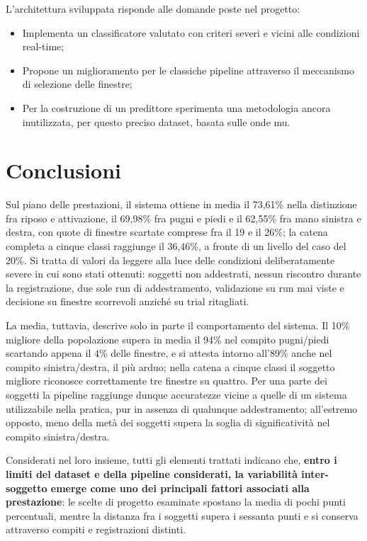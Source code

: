 L'architettura sviluppata risponde alle domande poste nel progetto: 
\begin{itemize}
    \item Implementa un classificatore valutato con criteri severi e vicini alle condizioni real-time;
    \item Propone un miglioramento per le classiche pipeline attraverso il meccanismo di selezione delle finestre;
    \item Per la costruzione di un predittore sperimenta una metodologia ancora inutilizzata, per questo preciso dataset, basata sulle onde mu.
\end{itemize}

\section{Conclusioni}
Sul piano delle prestazioni, il sistema ottiene in media il 73,61\% nella distinzione fra riposo e attivazione, il 69,98\% fra pugni e piedi e il 62,55\% fra mano sinistra e destra, con quote di finestre scartate comprese fra il 19 e il 26\%; la catena completa a cinque classi raggiunge il 36,46\%, a fronte di un livello del caso del 20\%. Si tratta di valori da leggere alla luce delle condizioni deliberatamente severe in cui sono stati ottenuti: soggetti non addestrati, nessun riscontro durante la registrazione, due sole run di addestramento, validazione su run mai viste e decisione su finestre scorrevoli anziché su trial ritagliati.

La media, tuttavia, descrive solo in parte il comportamento del sistema. Il 10\% migliore della popolazione supera in media il 94\% nel compito pugni/piedi scartando appena il 4\% delle finestre, e si attesta intorno all'89\% anche nel compito sinistra/destra, il più arduo; nella catena a cinque classi il soggetto migliore riconosce correttamente tre finestre su quattro. Per una parte dei soggetti la pipeline raggiunge dunque accuratezze vicine a quelle di un sistema utilizzabile nella pratica, pur in assenza di qualunque addestramento; all'estremo opposto, meno della metà dei soggetti supera la soglia di significatività nel compito sinistra/destra.

Considerati nel loro insieme, tutti gli elementi trattati indicano che, \textbf{entro i limiti del dataset e della pipeline considerati, la variabilità inter-soggetto emerge come uno dei principali fattori associati alla prestazione}: le scelte di progetto esaminate spostano la media di pochi punti percentuali, mentre la distanza fra i soggetti supera i sessanta punti e si conserva attraverso compiti e registrazioni distinti.


